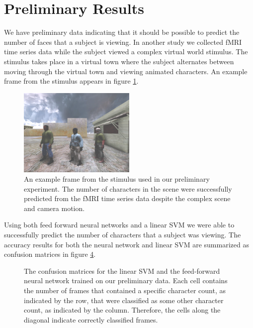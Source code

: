 \documentclass[12pt]{article}
\begin{document}
\section{Preliminary Results}
We have preliminary data indicating that it should be possible to predict the number of faces that a subject is viewing.
In another study we collected fMRI time series data while the subject viewed a complex virtual world stimulus.
The stimulus takes place in a virtual town where the subject alternates between moving through the virtual town and viewing animated characters.
An example frame from the stimulus appears in figure \ref{fig:preliminary-data-frame}.
\begin{figure}
\centering
\includegraphics[width=0.5\textwidth]{figures/preliminary-data-frame}
\caption{An example frame from the stimulus used in our preliminary experiment.
The number of characters in the scene were successfully predicted from the fMRI time series data despite the complex scene and camera motion.}
\label{fig:preliminary-data-frame}
\end{figure}
Using both feed forward neural networks and a linear SVM we were able to successfully predict the number of characters that a subject was viewing.
The accuracy results for both the neural network and linear SVM are summarized as confusion matrices in figure \ref{fig:preliminary-data-confusion}.
\begin{figure}
\centering
\begin{subfigure}{\textwidth}
\centering

\caption{}
\label{fig:svm-confusion}
\end{subfigure}
\begin{subfigure}{\textwidth}
\centering

\caption{}
\label{fig:nn-confusion}
\end{subfigure}
\caption{The confusion matrices for the  linear SVM and the  feed-forward neural network trained on our preliminary data.
Each cell contains the number of frames that contained a specific character count, as indicated by the row, that were classified as some other character count, as indicated by the column.
Therefore, the cells along the diagonal indicate correctly classified frames.}
\label{fig:preliminary-data-confusion}
\end{figure}
\end{document}
